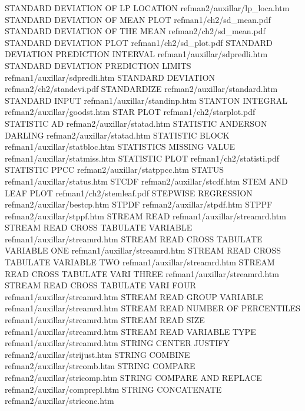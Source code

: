 STANDARD DEVIATION OF LP LOCATION       refman2/auxillar/lp_loca.htm
STANDARD DEVIATION OF MEAN PLOT         refman1/ch2/sd_mean.pdf
STANDARD DEVIATION OF THE MEAN          refman2/ch2/sd_mean.pdf
STANDARD DEVIATION PLOT                 refman1/ch2/sd_plot.pdf
STANDARD DEVIATION PREDICTION INTERVAL  refman1/auxillar/sdpredli.htm
STANDARD DEVIATION PREDICTION LIMITS    refman1/auxillar/sdpredli.htm
STANDARD DEVIATION                      refman2/ch2/standevi.pdf
STANDARDIZE                             refman2/auxillar/standard.htm
STANDARD INPUT                          refman1/auxillar/standinp.htm
STANTON INTEGRAL                        refman2/auxillar/goodst.htm
STAR PLOT                               refman1/ch2/starplot.pdf
STATISTIC AD                            refman2/auxillar/statad.htm
STATISTIC ANDERSON DARLING              refman2/auxillar/statad.htm
STATISTIC BLOCK                         refman1/auxillar/statbloc.htm
STATISTICS MISSING VALUE                refman1/auxillar/statmiss.htm
STATISTIC PLOT                          refman1/ch2/statisti.pdf
STATISTIC PPCC                          refman2/auxillar/statppcc.htm
STATUS                                  refman1/auxillar/status.htm
STCDF                                   refman2/auxillar/stcdf.htm
STEM AND LEAF PLOT                      refman1/ch2/stemleaf.pdf
STEPWISE REGRESSION                     refman2/auxillar/bestcp.htm
STPDF                                   refman2/auxillar/stpdf.htm
STPPF                                   refman2/auxillar/stppf.htm
STREAM READ                             refman1/auxillar/streamrd.htm
STREAM READ CROSS TABULATE VARIABLE     refman1/auxillar/streamrd.htm
STREAM READ CROSS TABULATE VARIABLE ONE refman1/auxillar/streamrd.htm
STREAM READ CROSS TABULATE VARIABLE TWO refman1/auxillar/streamrd.htm
STREAM READ CROSS TABULATE VARI THREE   refman1/auxillar/streamrd.htm
STREAM READ CROSS TABULATE VARI FOUR    refman1/auxillar/streamrd.htm
STREAM READ GROUP VARIABLE              refman1/auxillar/streamrd.htm
STREAM READ NUMBER OF PERCENTILES       refman1/auxillar/streamrd.htm
STREAM READ SIZE                        refman1/auxillar/streamrd.htm
STREAM READ VARIABLE TYPE               refman1/auxillar/streamrd.htm
STRING CENTER JUSTIFY                   refman2/auxillar/strijust.htm
STRING COMBINE                          refman2/auxillar/strcomb.htm
STRING COMPARE                          refman2/auxillar/stricomp.htm
STRING COMPARE AND REPLACE              refman2/auxillar/comprepl.htm
STRING CONCATENATE                      refman2/auxillar/striconc.htm
